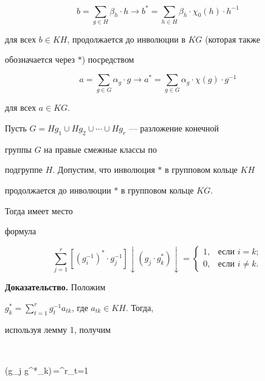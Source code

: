 $$


b=\sum_{g\in H}\beta_h\cdot h\longrightarrow


b^*=\sum_{h\in H}\beta_h\cdot\chi_0(h)\cdot h^{-1}


$$


для всех $b\in KH$, продолжается до инволюции в $KG$ (которая также


обозначается через $*$) посредством


$$


a=\sum_{g\in G}\alpha_g\cdot g\longrightarrow


a^*=\sum_{g\in G}\alpha_g\cdot\chi(g)\cdot g^{-1}


$$


для всех $a\in KG$.





\begin{lem}


Пусть $G=Hg_1\cup Hg_2\cup\dotsb\cup Hg_r$ --- разложение конечной


группы $G$ на правые смежные классы по


подгруппе $H$. Допустим, что инволюция $*$ в групповом кольце $KH$


продолжается до инволюции $*$ в групповом кольце $KG$.


Тогда имеет место


формула


$$


\sum^r_{j=1}[(g^{-1}_i)^*\cdot g^{-1}_j]\downarrow


(g_j\cdot g^*_k)\downarrow=


\begin{cases}


1, & \text{если }i=k;\\


0, & \text{если }i\ne k.


\end{cases}


$$


\end{lem}





{\bf Доказательство.} Положим


$g^*_k=\sum\limits^r_{t=1}g^{-1}_ta_{tk}$, где $a_{tk}\in KH$. Тогда,


используя лемму 1, получим


$$


(g_j g^*_k)\downarrow\,=\sum^r_{t=1}



